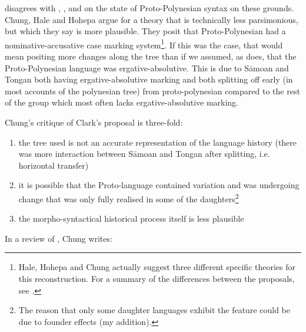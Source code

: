 \documentclass[draft,10pt]{article} %
\begin{document}
\citet{clark1976aspects} disagrees with \citet{hale_1968}, \citet{hohepa_1969}, and \citet{chung1978} on the state of Proto-Polynesian syntax on these grounds. Chung, Hale and Hohepa argue for a theory that is technically less parsimonious, but which they say is more plausible. They posit that Proto-Polynesian had a nominative-accusative case marking system\footnote{Hale, Hohepa and Chung actually suggest three different specific theories for this reconstruction. For a summary of the differences between the proposals, see \citet[247-249]{chung1978}.}. If this was the case, that would mean positing more changes along the tree than if we assumed, as \citet{clark1976aspects} does, that the Proto-Polynesian language was ergative-absolutive. This is due to S\={a}moan and Tongan both having ergative-absolutive marking and both splitting off early (in most accounts of the polynesian tree) from proto-polynesian compared to the rest of the group which most often lacks ergative-absolutive marking.

Chung's critique of Clark's proposal is three-fold: 
\begin{enumerate}[label=(\alph*)]
\item the tree used is not an accurate representation of the language history (there was more interaction between S\={a}moan and Tongan after splitting, i.e. horizontal transfer)
\item it is possible that the Proto-language contained variation and was undergoing change that was only fully realised in some of the daughters\footnote{The reason that only some daughter languages exhibit the feature could be due to founder effects (my addition).} 
\item the morpho-syntactical historical process itself is less plausible
\end{enumerate}

In a review of \citet{clark1976aspects}, Chung writes:
\end{document}
